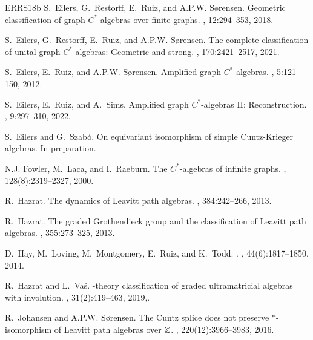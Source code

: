 \documentclass[12pt]{amsbook}%
\theoremstyle{defin}
\theoremstyle{remark}
\numberwithin{equation}{chapter}
\numberwithin{theor}{section}
\begin{document}
\begin{thebibliography}{ERRS18b}
S.~Eilers, G.~Restorff, E.~Ruiz, and A.P.W. S\o{}rensen.
\newblock Geometric classification of graph {$C^*$}-algebras over finite
  graphs.
, 12:294--353, 2018.

S.~Eilers, G.~Restorff, E.~Ruiz, and A.P.W. S\o{}rensen.
\newblock The complete classification of unital graph {$C^*$}-algebras:
  Geometric and strong.
, 170:2421--2517, 2021.

S.~Eilers, E.~Ruiz, and A.P.W. S{\o}rensen.
\newblock Amplified graph {$C^*$}-algebras.
, 5:121--150, 2012.

S.~Eilers, E.~Ruiz, and A.~Sims.
\newblock Amplified graph {$C^*$}-algebras {II}: {R}econstruction.
, 9:297--310, 2022.

S.~Eilers and G.~Szab\'o.
\newblock On equivariant isomorphism of simple {C}untz-{K}rieger algebras.
\newblock In preparation.

N.J. Fowler, M.~Laca, and I.~Raeburn.
\newblock The {$C^*$}-algebras of infinite graphs.
, 128(8):2319--2327, 2000.

R.~Hazrat.
\newblock The dynamics of {L}eavitt path algebras.
, 384:242--266, 2013.

R.~Hazrat.
\newblock The graded {G}rothendieck group and the classification of {L}eavitt
  path algebras.
, 355:273--325, 2013.

D.~{Hay}, M.~{Loving}, M.~{Montgomery}, E.~{Ruiz}, and K.~{Todd}.
.
, 44(6):1817--1850, 2014.

R.~Hazrat and L.~Va{\v s}.
-theory classification of graded ultramatricial algebras with
  involution.
, 31(2):419--463, 2019,.

R.~Johansen and A.P.W. S\o{}rensen.
\newblock The {C}untz splice does not preserve {$\ast$}-isomorphism of
  {L}eavitt path algebras over {$\Bbb{Z}$}.
, 220(12):3966--3983, 2016.


\end{thebibliography}
\end{document}
